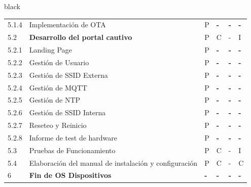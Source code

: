 \documentclass[11pt]{charter}
\begin{document}
\begin{landscape}
\begin{consigna}{black}
\begin{tabularx}{\linewidth}{@{}|p{1.3cm}|p{9.3cm}|p{3cm}|p{3cm}|p{3cm}|p{3cm}|@{}}
5.1.4                  & Implementación de OTA                                                                         & P          & \textbf{-} & \textbf{-} & \textbf{-} \\
5.2                    & \textbf{Desarrollo del portal cautivo}                                                        & P          & C          & -          & I          \\
5.2.1                  & Landing Page                                                                                  & P          & \textbf{-} & \textbf{-} & \textbf{-} \\
5.2.2                  & Gestión de Usuario                                                                            & P          & \textbf{-} & \textbf{-} & \textbf{-} \\
5.2.3                  & Gestión de SSID Externa                                                                       & P          & \textbf{-} & \textbf{-} & \textbf{-} \\
5.2.4                  & Gestión de MQTT                                                                               & P          & \textbf{-} & \textbf{-} & \textbf{-} \\
5.2.5                  & Gestión de NTP                                                                                & P          & \textbf{-} & \textbf{-} & \textbf{-} \\
5.2.6                  & Gestión de SSID Interna                                                                       & P          & \textbf{-} & \textbf{-} & \textbf{-} \\
5.2.7                  & Reseteo y Reinicio                                                                            & P          & \textbf{-} & \textbf{-} & \textbf{-} \\
5.2.8                  & Informe de test de hardware                                                                   & P          & \textbf{-} & \textbf{-} & \textbf{-} \\
5.3                    & Pruebas de Funcionamiento                                                                     & P          & C          & -          & I          \\
5.4                    & Elaboración del manual de   instalación y configuración                                       & P          & C          & -          & C          \\
6                      & \textbf{Fin de OS Dispositivos}                                                               & \textbf{-} & \textbf{-} & \textbf{-} & \textbf{-} \\

\end{tabularx}
\end{consigna}
\end{landscape}
\end{document}
